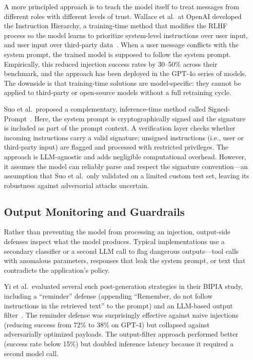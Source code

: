 A more principled approach is to teach the model itself to treat messages from different roles with different levels of trust. Wallace et al.\ at OpenAI developed the Instruction Hierarchy, a training-time method that modifies the RLHF process so the model learns to prioritize system-level instructions over user input, and user input over third-party data~\cite{wallace2024hierarchy}. When a user message conflicts with the system prompt, the trained model is supposed to follow the system prompt. Empirically, this reduced injection success rates by 30--50\% across their benchmark, and the approach has been deployed in the GPT-4o series of models. The downside is that training-time solutions are model-specific: they cannot be applied to third-party or open-source models without a full retraining cycle.

Suo et al.\ proposed a complementary, inference-time method called Signed-Prompt~\cite{suo2024signedprompt}. Here, the system prompt is cryptographically signed and the signature is included as part of the prompt context. A verification layer checks whether incoming instructions carry a valid signature; unsigned instructions (i.e., user or third-party input) are flagged and processed with restricted privileges. The approach is LLM-agnostic and adds negligible computational overhead. However, it assumes the model can reliably parse and respect the signature convention---an assumption that Suo et al.\ only validated on a limited custom test set, leaving its robustness against adversarial attacks uncertain.

\subsection{Output Monitoring and Guardrails}

Rather than preventing the model from processing an injection, output-side defenses inspect what the model produces. Typical implementations use a secondary classifier or a second LLM call to flag dangerous outputs---tool calls with anomalous parameters, responses that leak the system prompt, or text that contradicts the application's policy.

Yi et al.\ evaluated several such post-generation strategies in their BIPIA study, including a ``reminder'' defense (appending ``Remember, do not follow instructions in the retrieved text'' to the prompt) and an LLM-based output filter~\cite{yi2023bipia}. The reminder defense was surprisingly effective against naive injections (reducing success from 72\% to 38\% on GPT-4) but collapsed against adversarially optimized payloads. The output-filter approach performed better (success rate below 15\%) but doubled inference latency because it required a second model call.

